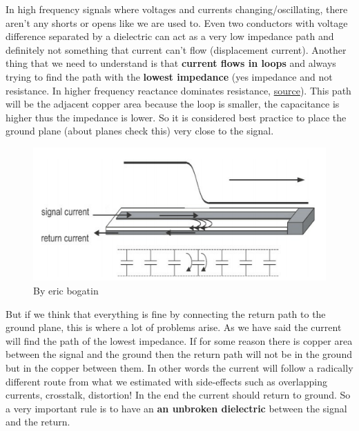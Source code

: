 \documentclass[12pt]{article}
\begin{document}

In high frequency signals where voltages and currents changing/oscillating, there aren't any shorts or opens like we are used to. Even two conductors with voltage difference separated by a dielectric can act as a very low impedance path and definitely not something that current can't flow (displacement current). Another thing that we need to understand is that \textbf{current flows in loops} and always trying to find the path with the \textbf{lowest impedance} (yes impedance and not resistance. In higher frequency reactance dominates resistance, \href{https://learnemc.com/pcb-layout}{source}). This path will be the adjacent copper area because the loop is smaller, the capacitance is higher thus the impedance is lower. So it is considered best practice to place the ground plane (about planes check this) very close to the signal.

\begin{figure}[h!]
	\centering
	\includegraphics[keepaspectratio, width=\textwidth, height=.2\textheight]{assets/signal_return.png}
	\caption{By eric bogatin}
\end{figure}

But if we think that everything is fine by connecting the return path to the ground plane, this is where a lot of problems arise. As we have said the current will find the path of the lowest impedance. If for some reason there is copper area between the signal and the ground then the return path will not be in the ground but in the copper between them. In other words the current will follow a radically different route from what we estimated with side-effects such as overlapping currents, crosstalk, distortion! In the end the current should return to ground. So a very important rule is to have an \textbf{an unbroken dielectric} between the signal and the return. 
\end{document}
